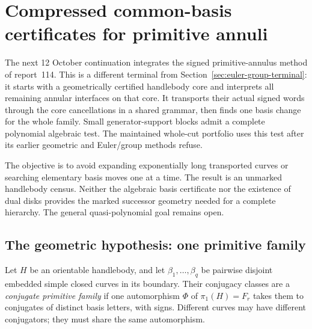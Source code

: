 \section{Compressed common-basis certificates for primitive annuli}
\label{sec:signed-primitive-annuli}

The next 12 October continuation integrates the signed primitive-annulus
method of report~114.  This is a different terminal from
Section~\ref{sec:euler-group-terminal}: it starts with a geometrically
certified handlebody core and interprets all remaining annular interfaces
on that core.  It transports their actual signed words through the core
cancellations in a shared grammar, then finds one basis change for the
whole family.  Small generator-support blocks admit a complete polynomial
algebraic test.  The maintained whole-cut portfolio uses this test after
its earlier geometric and Euler/group methods refuse.

The objective is to avoid expanding exponentially long transported curves
or searching elementary basis moves one at a time.  The result is an
unmarked handlebody census.  Neither the algebraic basis certificate nor
the existence of dual disks provides the marked successor geometry needed
for a complete hierarchy.  The general quasi-polynomial goal remains open.

\subsection{The geometric hypothesis: one primitive family}

Let $H$ be an orientable handlebody, and let $\beta_1,\ldots,\beta_q$ be
pairwise disjoint embedded simple closed curves in its boundary.  Their
conjugacy classes are a \emph{conjugate primitive family} if one
automorphism $\Phi$ of $\pi_1(H)=F_r$ takes them to conjugates of distinct
basis letters, with signs.  Different curves may have different
conjugators; they must share the same automorphism.

